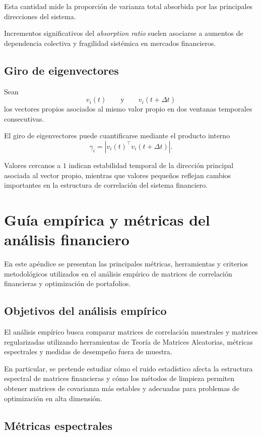 \documentclass[letterpaper,12pt,oneside]{book}
\begin{document}
Esta cantidad mide la proporción de varianza total absorbida por las principales direcciones del sistema.

Incrementos significativos del \textit{absorption ratio} suelen asociarse a aumentos de dependencia colectiva y fragilidad sistémica en mercados financieros.

\section{Giro de eigenvectores}

Sean
\[
v_i(t)
\qquad
\text{y}
\qquad
v_i(t+\Delta t)
\]
los vectores propios asociados al mismo valor propio en dos ventanas temporales consecutivas.

El giro de eigenvectores puede cuantificarse mediante el producto interno
\[
\gamma_i
=
\left|
v_i(t)^\top
v_i(t+\Delta t)
\right|.
\]

Valores cercanos a \(1\) indican estabilidad temporal de la dirección principal asociada al vector propio, mientras que valores pequeños reflejan cambios importantes en la estructura de correlación del sistema financiero.

\clearpage

\chapter{Guía empírica y métricas del análisis financiero}

En este apéndice se presentan las principales métricas, herramientas y criterios metodológicos utilizados en el análisis empírico de matrices de correlación financieras y optimización de portafolios.

\section{Objetivos del análisis empírico}

El análisis empírico busca comparar matrices de correlación muestrales y matrices regularizadas utilizando herramientas de Teoría de Matrices Aleatorias, métricas espectrales y medidas de desempeño fuera de muestra.

En particular, se pretende estudiar cómo el ruido estadístico afecta la estructura espectral de matrices financieras y cómo los métodos de limpieza permiten obtener matrices de covarianza más estables y adecuadas para problemas de optimización en alta dimensión.

\section{Métricas espectrales}
\end{document}
